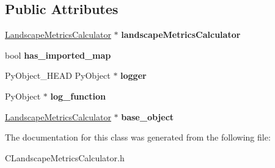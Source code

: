 \subsection*{Public Attributes}
\begin{DoxyCompactItemize}
\item 
\hyperlink{class_landscape_metrics_calculator}{Landscape\+Metrics\+Calculator} $\ast$ {\bfseries landscape\+Metrics\+Calculator}\hypertarget{class_py_l_m_c_a6a500df66173d04cc71287821f6d8444}{}\label{class_py_l_m_c_a6a500df66173d04cc71287821f6d8444}

\item 
bool {\bfseries has\+\_\+imported\+\_\+map}\hypertarget{class_py_l_m_c_a282bf8674cb032dc0f010e037ac393c9}{}\label{class_py_l_m_c_a282bf8674cb032dc0f010e037ac393c9}

\item 
Py\+Object\+\_\+\+H\+E\+AD Py\+Object $\ast$ {\bfseries logger}\hypertarget{class_py_template_a5b741a472639d65f9bcad29afa16ec99}{}\label{class_py_template_a5b741a472639d65f9bcad29afa16ec99}

\item 
Py\+Object $\ast$ {\bfseries log\+\_\+function}\hypertarget{class_py_template_a98bb8152faa73d028342d5cf260f0372}{}\label{class_py_template_a98bb8152faa73d028342d5cf260f0372}

\item 
\hyperlink{class_landscape_metrics_calculator}{Landscape\+Metrics\+Calculator} $\ast$ {\bfseries base\+\_\+object}\hypertarget{class_py_template_ac7bf12e84289f480eaa79fd7c421614a}{}\label{class_py_template_ac7bf12e84289f480eaa79fd7c421614a}

\end{DoxyCompactItemize}


The documentation for this class was generated from the following file\+:\begin{DoxyCompactItemize}
\item 
C\+Landscape\+Metrics\+Calculator.\+h\end{DoxyCompactItemize}
